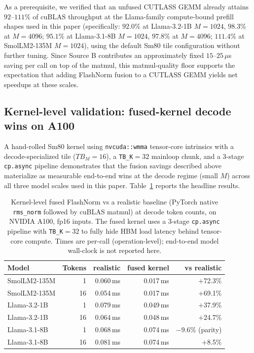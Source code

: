 \documentclass{article}
\begin{document}
As a prerequisite, we verified that an unfused CUTLASS GEMM already attains $92$--$111$\% of cuBLAS throughput at the Llama-family compute-bound prefill shapes used in this paper (specifically: $92.0$\% at Llama-3.2-1B $M{=}1024$, $98.3$\% at $M{=}4096$; $95.1$\% at Llama-3.1-8B $M{=}1024$, $97.8$\% at $M{=}4096$; $111.4$\% at SmolLM2-135M $M{=}1024$), using the default Sm80 tile configuration without further tuning. Since Source B contributes an approximately fixed $15$--$25\,\mu$s saving per call on top of the matmul, this matmul-quality floor supports the expectation that adding FlashNorm fusion to a CUTLASS GEMM yields net speedups at these scales.

\subsection{Kernel-level validation: fused-kernel decode wins on A100}\label{app:a100-decode}

A hand-rolled Sm80 kernel using \texttt{nvcuda::wmma} tensor-core intrinsics with a decode-specialized tile ($TB_M{=}16$), a \texttt{TB\_K}$=32$ mainloop chunk, and a 3-stage \texttt{cp.async} pipeline demonstrates that the fusion savings described above materialize as measurable end-to-end wins at the decode regime (small $M$) across all three model scales used in this paper. Table~\ref{tab:a100-decode-wins} reports the headline results.

\begin{table}[h!] \centering
\caption{Kernel-level fused FlashNorm vs a realistic baseline (PyTorch native \texttt{rms\_norm} followed by cuBLAS matmul) at decode token counts, on NVIDIA A100, fp16 inputs. The fused kernel uses a 3-stage \texttt{cp.async} pipeline with \texttt{TB\_K}$=32$ to fully hide HBM load latency behind tensor-core compute. Times are per-call (operation-level); end-to-end model wall-clock is not reported here.}
\label{tab:a100-decode-wins}
\begin{tabular}{l r r r r}
\hline
Model & Tokens & realistic & fused kernel & vs realistic \\
\hline
SmolLM2-135M & 1   & 0.060\,ms & 0.017\,ms & $+$72.3\% \\
SmolLM2-135M & 16  & 0.054\,ms & 0.017\,ms & $+$69.1\% \\
Llama-3.2-1B & 1   & 0.079\,ms & 0.049\,ms & $+$37.9\% \\
Llama-3.2-1B & 16  & 0.064\,ms & 0.048\,ms & $+$24.7\% \\
Llama-3.1-8B & 1   & 0.068\,ms & 0.074\,ms & $-$9.6\% (parity) \\
Llama-3.1-8B & 16  & 0.081\,ms & 0.074\,ms & $+$8.5\% \\
\hline
\end{tabular}
\end{table}
\end{document}
